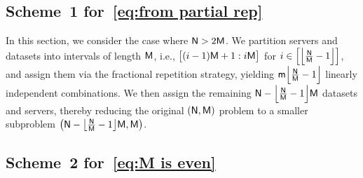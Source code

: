 \documentclass[conference,letterpaper]{IEEEtran}
\begin{document}


\subsection{\texorpdfstring{Scheme~1 for~\eqref{eq:from partial rep}}{Scheme 1 for Eq. (X)}}
\label{sub:partial rep}
In this section, we consider the case where ${\sf N} > 2{\sf M}$. We partition servers and datasets into intervals of length \({\sf M}\), i.e., \(\bigl[(i-1){\sf M} + 1: i{\sf M}\bigr]\) for \(i \in \Bigl[\Bigl\lfloor \frac{{\sf N}}{{\sf M}} - 1 \Bigr\rfloor\Bigr]\), and assign them via the fractional repetition strategy, yielding \({\sf m} \Bigl\lfloor \frac{{\sf N}}{{\sf M}} - 1 \Bigr\rfloor\) linearly independent combinations. We then assign the remaining \({\sf N} - \Bigl\lfloor \frac{{\sf N}}{{\sf M}} - 1 \Bigr\rfloor {\sf M}\) datasets and servers, thereby reducing the original \(({\sf N}, {\sf M})\) problem to a smaller subproblem \(\bigl({\sf N} - \bigl\lfloor \tfrac{{\sf N}}{{\sf M}} - 1 \bigr\rfloor {\sf M}, {\sf M}\bigr)\).

 
\subsection{\texorpdfstring{Scheme~2 for~\eqref{eq:M is even}}{Scheme 2 for Eq. (X)}}
\end{document}
